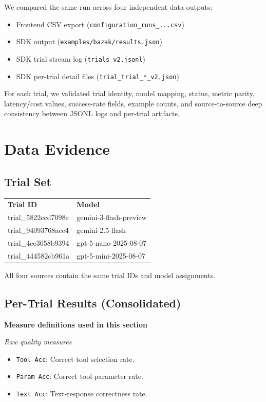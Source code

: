\documentclass[11pt]{article}
\begin{document}
We compared the same run across four independent data outputs:
\begin{itemize}
    \item Frontend CSV export (\texttt{configuration\_runs\_...csv})
    \item SDK output (\texttt{examples/bazak/results.json})
    \item SDK trial stream log (\texttt{trials\_v2.jsonl})
    \item SDK per-trial detail files (\texttt{trial\_trial\_*\_v2.json})
\end{itemize}

For each trial, we validated trial identity, model mapping, status, metric parity, latency/cost values, success-rate fields, example counts, and source-to-source deep consistency between JSONL logs and per-trial artifacts.

\section{Data Evidence}

\subsection{Trial Set}

\begin{tabularx}{\textwidth}{>{\ttfamily}lX}
\rowcolor{TableHeader}
\normalfont\bfseries Trial ID & \bfseries Model \\
trial\_5822ccd7098e & gemini-3-flash-preview \\
trial\_94093768acc4 & gemini-2.5-flash \\
trial\_4ce3058b9394 & gpt-5-nano-2025-08-07 \\
trial\_444582cb961a & gpt-5-mini-2025-08-07 \\
\end{tabularx}

All four sources contain the same trial IDs and model assignments.

\subsection{Per-Trial Results (Consolidated)}

\textbf{Measure definitions used in this section}

\textit{Raw quality measures}
\begin{itemize}
    \item \texttt{Tool Acc}: Correct tool selection rate.
    \item \texttt{Param Acc}: Correct tool-parameter rate.
    \item \texttt{Text Acc}: Text-response correctness rate.
\end{itemize}
\end{document}
